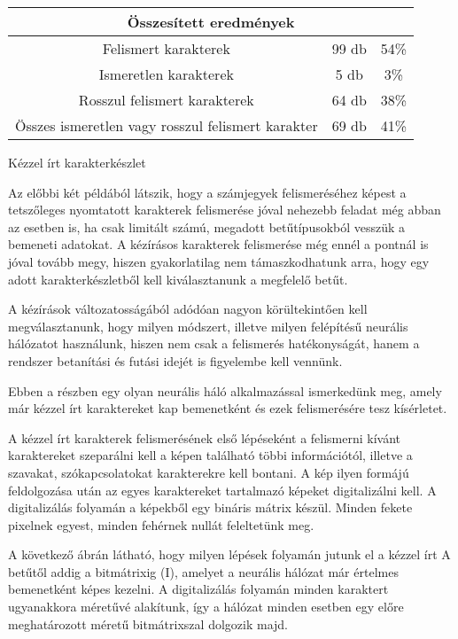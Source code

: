 \begin{center}
\begin{tabular}{ |c|c|c| }
\hline
\multicolumn{3}{|c|}{\textbf{Összesített eredmények}}\\
\hline
Felismert karakterek & 99 db & 54\%\\
\hline
Ismeretlen karakterek & 5 db & 3\%\\
\hline
Rosszul felismert karakterek & 64 db & 38\%\\
\hline
Összes ismeretlen vagy rosszul felismert karakter & 69 db & 41\%\\
\hline
\end{tabular}
\end{center}


Kézzel írt karakterkészlet

Az előbbi két példából látszik, hogy a számjegyek felismeréséhez képest a tetszőleges nyomtatott karakterek felismerése jóval nehezebb feladat még abban az esetben is, ha csak limitált számú, megadott betűtípusokból vesszük a bemeneti adatokat. A kézírásos karakterek felismerése még ennél a pontnál is jóval tovább megy, hiszen gyakorlatilag nem támaszkodhatunk arra, hogy egy adott karakterkészletből kell kiválasztanunk a megfelelő betűt.

A kézírások változatosságából adódóan nagyon körültekintően kell megválasztanunk, hogy milyen módszert, illetve milyen felépítésű neurális hálózatot használunk, hiszen nem csak a felismerés hatékonyságát, hanem a rendszer betanítási és futási idejét is figyelembe kell
vennünk.

Ebben a részben egy olyan neurális háló alkalmazással ismerkedünk meg, amely már kézzel írt karaktereket kap bemenetként és ezek felismerésére tesz kísérletet. 

A kézzel írt karakterek felismerésének első lépéseként a felismerni kívánt karaktereket szeparálni kell a képen található többi információtól, illetve a szavakat, szókapcsolatokat karakterekre kell bontani. A kép ilyen formájú feldolgozása után az egyes karaktereket tartalmazó képeket digitalizálni kell. A digitalizálás folyamán a képekből egy bináris mátrix készül. Minden fekete pixelnek egyest, minden fehérnek nullát feleltetünk meg. 

A következő ábrán látható, hogy milyen lépések folyamán jutunk el a kézzel írt A betűtől addig a bitmátrixig (I), amelyet a neurális hálózat már értelmes bemenetként képes kezelni. A digitalizálás folyamán minden karaktert ugyanakkora méretűvé alakítunk, így a hálózat minden esetben egy előre meghatározott méretű bitmátrixszal dolgozik majd. 

